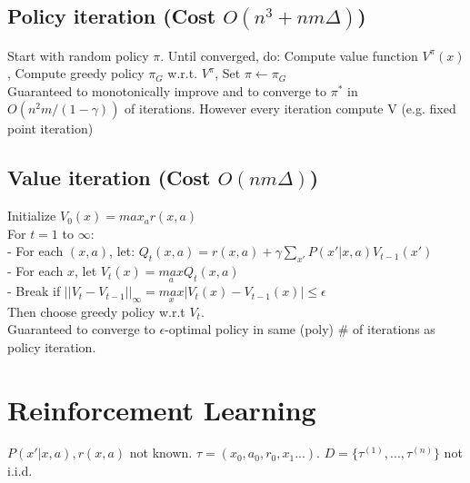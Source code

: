 \subsection{Policy iteration (Cost $O(n^3+nm\Delta)$)}
Start with random policy $\pi$.
Until converged, do:
Compute value function $V^\pi (x)$, Compute greedy policy $\pi_G$ w.r.t. $V^\pi$, Set $\pi \leftarrow \pi_G$\\
Guaranteed to monotonically improve and to converge to $\pi^*$ in $O(n^2m/(1-\gamma))$ of iterations.
However every iteration compute V (e.g. fixed point iteration)

\subsection{Value iteration (Cost $O(nm\Delta)$)}
Initialize $V_0(x)=max_a r(x,a)$\\
For $t=1$ to $\infty$:\\
- For each $(x,a)$, let: $Q_t(x,a)=r(x,a)+\gamma\sum_{x'}P(x'|x,a)V_{t-1}(x')$\\
- For each $x$, let $V_t(x)=\underset{a}{max}Q_t(x,a)$\\
- Break if $||V_t-V_{t-1}||_{\infty}=\underset{x}{max}|V_t(x)-V_{t-1}(x)|\leq\epsilon$\\
Then choose greedy policy w.r.t $V_t$.\\
Guaranteed to converge to $\epsilon$-optimal policy in same (poly) \# of iterations as policy iteration.

\section{Reinforcement Learning}
$P(x'|x,a), r(x,a)$ not known. $\tau = (x_{0}, a_{0},r_{0}, x_{1}...)$. $D=\{\tau^{(1)}, ..., \tau^{(n )}\}$
not i.i.d.


